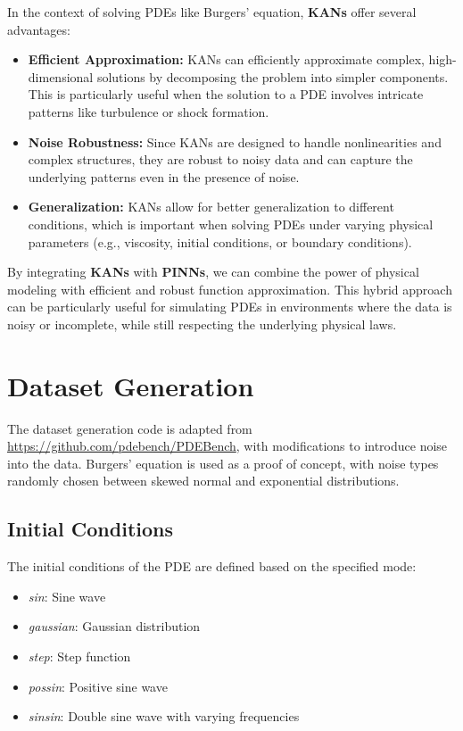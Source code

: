 \documentclass[conference]{IEEEtran}
\begin{document}
In the context of solving PDEs like Burgers’ equation, \textbf{KANs} offer several advantages:
\begin{itemize}
    \item \textbf{Efficient Approximation:} KANs can efficiently approximate complex, high-dimensional solutions by decomposing the problem into simpler components. This is particularly useful when the solution to a PDE involves intricate patterns like turbulence or shock formation.
    \item \textbf{Noise Robustness:} Since KANs are designed to handle nonlinearities and complex structures, they are robust to noisy data and can capture the underlying patterns even in the presence of noise.
    \item \textbf{Generalization:} KANs allow for better generalization to different conditions, which is important when solving PDEs under varying physical parameters (e.g., viscosity, initial conditions, or boundary conditions).
\end{itemize}

By integrating \textbf{KANs} with \textbf{PINNs}, we can combine the power of physical modeling with efficient and robust function approximation. This hybrid approach can be particularly useful for simulating PDEs in environments where the data is noisy or incomplete, while still respecting the underlying physical laws.

\section{Dataset Generation}

The dataset generation code is adapted from \url{https://github.com/pdebench/PDEBench}, with modifications to introduce noise into the data. Burgers' equation is used as a proof of concept, with noise types randomly chosen between skewed normal and exponential distributions.

\subsection{Initial Conditions}
The initial conditions of the PDE are defined based on the specified mode:
\begin{itemize}
    \item \textit{sin}: Sine wave
    \item \textit{gaussian}: Gaussian distribution
    \item \textit{step}: Step function
    \item \textit{possin}: Positive sine wave
    \item \textit{sinsin}: Double sine wave with varying frequencies
\end{itemize}
\end{document}
